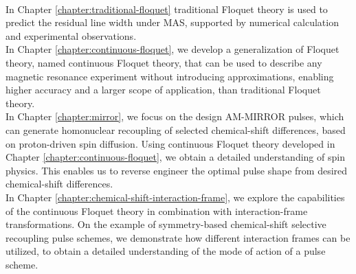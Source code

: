 \\
In Chapter \ref{chapter:traditional-floquet} traditional Floquet theory is %
used to predict the residual line width under MAS, supported by numerical calculation and experimental observations. 
\\
In Chapter \ref{chapter:continuous-floquet}, we develop a generalization of Floquet theory, named continuous Floquet theory, that can be used to describe any magnetic resonance experiment without introducing approximations, enabling higher accuracy and a larger scope of application, than traditional Floquet theory.
\\
In Chapter \ref{chapter:mirror}, we focus on the design AM-MIRROR pulses, which can generate homonuclear recoupling of selected chemical-shift differences, based on proton-driven spin diffusion. Using continuous Floquet theory developed in Chapter \ref{chapter:continuous-floquet}, we obtain a detailed understanding of spin physics. This enables us to reverse engineer the optimal pulse shape from desired chemical-shift differences.
\\
In Chapter \ref{chapter:chemical-shift-interaction-frame}, we explore the capabilities of the continuous Floquet theory in combination with interaction-frame transformations. %
On the example of symmetry-based chemical-shift selective recoupling pulse schemes, we demonstrate how different interaction frames %
can be utilized, to obtain a detailed understanding of the mode of action of a pulse scheme.
